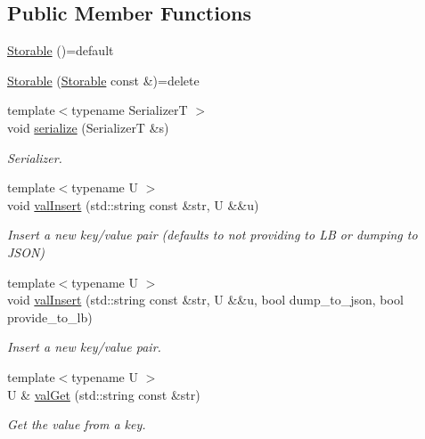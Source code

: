 \subsection*{Public Member Functions}
\begin{DoxyCompactItemize}
\item 
\hyperlink{structvt_1_1vrt_1_1collection_1_1storage_1_1_storable_aa6cb609d17c3fffd1416842cf9cc27e9}{Storable} ()=default
\item 
\hyperlink{structvt_1_1vrt_1_1collection_1_1storage_1_1_storable_a5a3e15eefa62b57645c73b06a0ffcbea}{Storable} (\hyperlink{structvt_1_1vrt_1_1collection_1_1storage_1_1_storable}{Storable} const \&)=delete
\item 
{\footnotesize template$<$typename SerializerT $>$ }\\void \hyperlink{structvt_1_1vrt_1_1collection_1_1storage_1_1_storable_a9fac390a50e3de2776afb730dd3c0418}{serialize} (SerializerT \&s)
\begin{DoxyCompactList}\small\item\em Serializer. \end{DoxyCompactList}\item 
{\footnotesize template$<$typename U $>$ }\\void \hyperlink{structvt_1_1vrt_1_1collection_1_1storage_1_1_storable_a8c0cbce1b3e261dd375d431a56a7c350}{val\+Insert} (std\+::string const \&str, U \&\&u)
\begin{DoxyCompactList}\small\item\em Insert a new key/value pair (defaults to not providing to LB or dumping to J\+S\+ON) \end{DoxyCompactList}\item 
{\footnotesize template$<$typename U $>$ }\\void \hyperlink{structvt_1_1vrt_1_1collection_1_1storage_1_1_storable_a0408ee884f29a44e44af8819d9fc3d96}{val\+Insert} (std\+::string const \&str, U \&\&u, bool dump\+\_\+to\+\_\+json, bool provide\+\_\+to\+\_\+lb)
\begin{DoxyCompactList}\small\item\em Insert a new key/value pair. \end{DoxyCompactList}\item 
{\footnotesize template$<$typename U $>$ }\\U \& \hyperlink{structvt_1_1vrt_1_1collection_1_1storage_1_1_storable_a81a60463dff73c6375422344c8eb410c}{val\+Get} (std\+::string const \&str)
\begin{DoxyCompactList}\small\item\em Get the value from a key. \end{DoxyCompactList}\item 

\end{DoxyCompactItemize}
